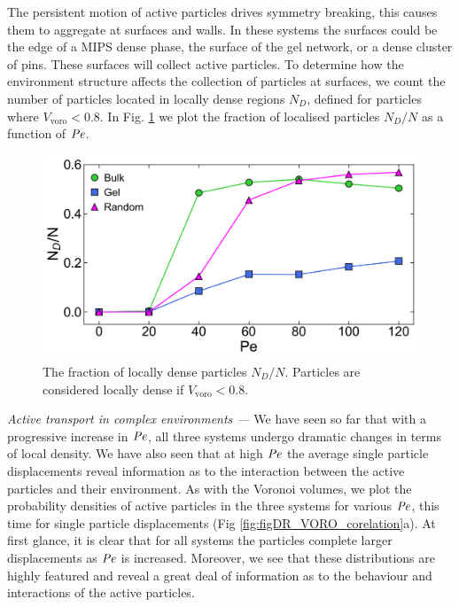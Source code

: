 The persistent motion of active particles drives symmetry breaking, this causes them to aggregate at surfaces and walls. In these systems the surfaces could be the edge of a MIPS dense phase, the surface of the gel network, or a dense cluster of pins. These surfaces will collect active particles. To determine how the environment structure affects the collection of particles at surfaces, we count the number of particles located in locally dense regions $N_D$, defined for particles where $V_{\textrm{voro}} < 0.8$. In Fig. \ref{fig:figLocallyDense} we plot the fraction of localised particles $N_{D}/N$ as a function of $\operatorname{\mathit{P\kern-.08em e}}$.


\begin{figure}
	\centering
	\includegraphics[width=0.7\linewidth]{chapters/activeConfinement/figsActiveConfinement/figLocalised.png}
	\caption[Fraction of locally dense particles in the three systems]{The fraction of locally dense particles $N_D / N$.  Particles are considered locally dense if $V_{\textrm{voro}} < 0.8$.}
	\label{fig:figLocallyDense}
\end{figure}

\textit{Active transport in complex environments ---}
We have seen so far that with a progressive increase in $\operatorname{\mathit{P\kern-.08em e}}$, all three systems undergo dramatic changes in terms of local density. We have also seen that at high $\operatorname{\mathit{P\kern-.08em e}}$ the average single particle displacements reveal information as to the interaction between the active particles and their environment. As with the Voronoi volumes, we plot the probability densities of active particles in the three systems for various $\operatorname{\mathit{P\kern-.08em e}}$, this time for single particle displacements (Fig \ref{fig:figDR_VORO_corelation}a). At first glance, it is clear that for all systems the particles complete larger displacements as $\operatorname{\mathit{P\kern-.08em e}}$ is increased. Moreover, we see that these distributions are highly featured and reveal a great deal of information as to the behaviour and interactions of the active particles. 

